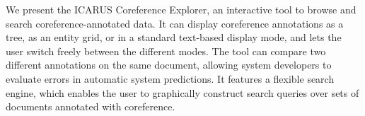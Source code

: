 We present the ICARUS Coreference Explorer, an interactive tool to browse and search coreference-annotated data. It can display coreference annotations as a tree, as an entity grid, or in a standard text-based display mode, and lets the user switch freely between the different modes. The tool can compare two different annotations on the same document, allowing system developers to evaluate errors in automatic system predictions. It features a flexible search engine, which enables the user to graphically construct search queries over sets of documents annotated with coreference.
